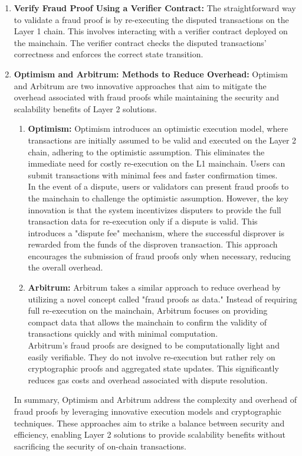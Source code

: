 \begin{enumerate}
	\item \textbf{Verify Fraud Proof Using a Verifier Contract:} The straightforward way to validate a fraud proof is by re-executing the disputed transactions on the Layer 1 chain. This involves interacting with a verifier contract deployed on the mainchain. The verifier contract checks the disputed transactions' correctness and enforces the correct state transition.
	\item \textbf{Optimism and Arbitrum: Methods to Reduce Overhead:} Optimism and Arbitrum are two innovative approaches that aim to mitigate the overhead associated with fraud proofs while maintaining the security and scalability benefits of Layer 2 solutions.
	\begin{enumerate}
		\item \textbf{Optimism:} Optimism introduces an optimistic execution model, where transactions are initially assumed to be valid and executed on the Layer 2 chain, adhering to the optimistic assumption. This eliminates the immediate need for costly re-execution on the L1 mainchain. Users can submit transactions with minimal fees and faster confirmation times.\\
		In the event of a dispute, users or validators can present fraud proofs to the mainchain to challenge the optimistic assumption. However, the key innovation is that the system incentivizes disputers to provide the full transaction data for re-execution only if a dispute is valid. This introduces a "dispute fee" mechanism, where the successful disprover is rewarded from the funds of the disproven transaction. This approach encourages the submission of fraud proofs only when necessary, reducing the overall overhead.
		\item \textbf{Arbitrum:} Arbitrum takes a similar approach to reduce overhead by utilizing a novel concept called "fraud proofs as data." Instead of requiring full re-execution on the mainchain, Arbitrum focuses on providing compact data that allows the mainchain to confirm the validity of transactions quickly and with minimal computation.\\
		Arbitrum's fraud proofs are designed to be computationally light and easily verifiable. They do not involve re-execution but rather rely on cryptographic proofs and aggregated state updates. This significantly reduces gas costs and overhead associated with dispute resolution.
	\end{enumerate}
	In summary, Optimism and Arbitrum address the complexity and overhead of fraud proofs by leveraging innovative execution models and cryptographic techniques. These approaches aim to strike a balance between security and efficiency, enabling Layer 2 solutions to provide scalability benefits without sacrificing the security of on-chain transactions.
\end{enumerate}
